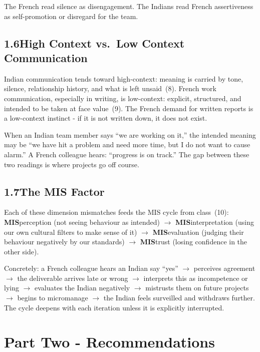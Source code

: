 \documentclass[12pt, a4paper]{article}
\begin{document}
The French read silence as disengagement. The Indians read French assertiveness as self-promotion or disregard for the team.

\subsection*{1.6\quad High Context vs.\ Low Context Communication}

Indian communication tends toward high-context: meaning is carried by tone, silence, relationship history, and what is left unsaid~(8). French work communication, especially in writing, is low-context: explicit, structured, and intended to be taken at face value~(9). The French demand for written reports is a low-context instinct - if it is not written down, it does not exist.

When an Indian team member says ``we are working on it,'' the intended meaning may be ``we have hit a problem and need more time, but I do not want to cause alarm.'' A French colleague hears: ``progress is on track.'' The gap between these two readings is where projects go off course.

\subsection*{1.7\quad The MIS Factor}

Each of these dimension mismatches feeds the MIS cycle from class~(10): \textbf{MIS}perception (not seeing behaviour as intended) $\rightarrow$ \textbf{MIS}interpretation (using our own cultural filters to make sense of it) $\rightarrow$ \textbf{MIS}evaluation (judging their behaviour negatively by our standards) $\rightarrow$ \textbf{MIS}trust (losing confidence in the other side).

Concretely: a French colleague hears an Indian say ``yes'' $\rightarrow$ perceives agreement $\rightarrow$ the deliverable arrives late or wrong $\rightarrow$ interprets this as incompetence or lying $\rightarrow$ evaluates the Indian negatively $\rightarrow$ mistrusts them on future projects $\rightarrow$ begins to micromanage $\rightarrow$ the Indian feels surveilled and withdraws further. The cycle deepens with each iteration unless it is explicitly interrupted.

\newpage

\section*{Part Two  -  Recommendations}
\end{document}
